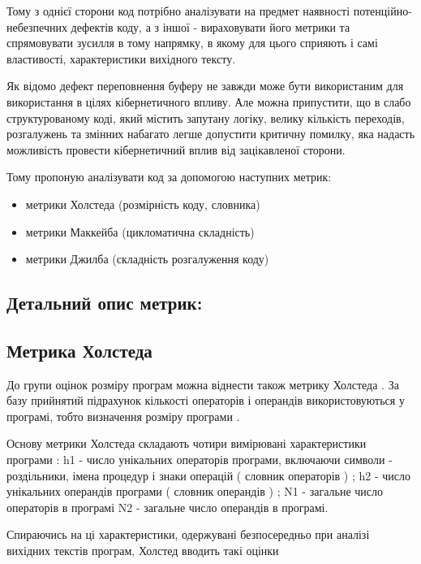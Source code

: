 Тому з однієї сторони код потрібно аналізувати на предмет наявності потенційно-небезпечних дефектів коду, а з іншої - вираховувати його метрики та спрямовувати зусилля в тому напрямку, в якому для цього сприяють і самі властивості, характеристики вихідного тексту.

Як відомо дефект переповнення буферу не завжди може бути використаним для використання в цілях кібернетичного впливу.
Але можна припустити, що в слабо структурованому коді, який містить запутану логіку, велику кількість переходів, розгалужень та змінних набагато легше допустити критичну помилку, яка надасть можливість провести кібернетичний вплив від зацікавленої сторони.

Тому пропоную аналізувати код за допомогою наступних метрик: \begin{itemize}
\item {} 
метрики Холстеда (розмірність коду, словника)

\item {} 
метрики Маккейба (цикломатична складність)

\item {} 
метрики Джилба (складність розгалуження коду)

\end{itemize}

\subsection{Детальний опис метрик:}
\label{2section:id9}

\subsection{Метрика Холстеда}
\label{2section:id10}
До групи оцінок розміру програм можна віднести також метрику Холстеда . За базу прийнятий підрахунок кількості операторів і операндів використовуються у програмі, тобто визначення розміру програми .

Основу метрики Холстеда складають чотири вимірювані характеристики програми : h1 - число унікальних операторів програми, включаючи символи - роздільники, імена процедур і знаки операцій ( словник операторів ) ; h2 - число унікальних операндів програми ( словник операндів ) ; N1 - загальне число операторів в програмі N2 - загальне число операндів в програмі.

Спираючись на ці характеристики, одержувані безпосередньо при аналізі вихідних текстів програм, Холстед вводить такі оцінки

